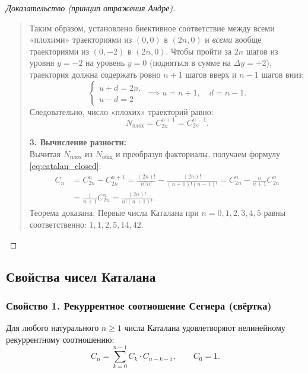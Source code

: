 \begin{proof}[Доказательство (принцип отражения Андре)]
\begin{quote}
        Таким образом, установлено биективное соответствие между всеми 
        «плохими» траекториями из $(0, 0)$ в $(2n, 0)$ и \emph{всеми} 
        вообще траекториями из $(0, -2)$ в $(2n, 0)$. Чтобы пройти за $2n$ 
        шагов из уровня $y = -2$ на уровень $y = 0$ (подняться в сумме на 
        $\Delta y = +2$), траектория должна содержать ровно $n + 1$ шагов 
        вверх и $n - 1$ шагов вниз:
        \[
            \begin{cases}
                u + d = 2n, \\
                u - d = 2
            \end{cases}
            \implies u = n + 1, \quad d = n - 1.
        \]
        Следовательно, число «плохих» траекторий равно:
        \[
            N_{\text{плох}} = C_{2n}^{n+1} = C_{2n}^{n-1}.
        \]

        \textbf{3. Вычисление разности:}\\
        Вычитая $N_{\text{плох}}$ из $N_{\text{общ}}$ и преобразуя 
        факториалы, получаем формулу \eqref{eq:catalan_closed}:
        \begin{equation} \label{eq:catalan_diff}
            \begin{aligned}
                C_n &= C_{2n}^n - C_{2n}^{n+1} = 
                \frac{(2n)!}{n! \, n!} - \frac{(2n)!}{(n + 1)!(n - 1)!} = 
                C_{2n}^n - \frac{n}{n + 1} C_{2n}^n \\
                &= \frac{1}{n + 1} C_{2n}^n = \frac{(2n)!}{n!(n + 1)!}.
            \end{aligned} \tag{3}
        \end{equation}
        Теорема доказана. Первые числа Каталана при $n = 0, 1, 2, 3, 4, 5$ 
        равны соответственно: $1, 1, 2, 5, 14, 42$.
    \end{quote}
\end{proof}

\subsection{Свойства чисел Каталана}

\subsubsection{Свойство 1. Рекуррентное соотношение Сегнера (свёртка)}

\begin{theorem}
    Для любого натурального $n \ge 1$ числа Каталана удовлетворяют 
    нелинейному рекуррентному соотношению:
    \begin{equation} \label{eq:catalan_conv}
        C_n = \sum_{k=0}^{n-1} C_k \cdot C_{n-k-1}, \qquad C_0 = 1. \tag{4}
    \end{equation}
\end{theorem}

